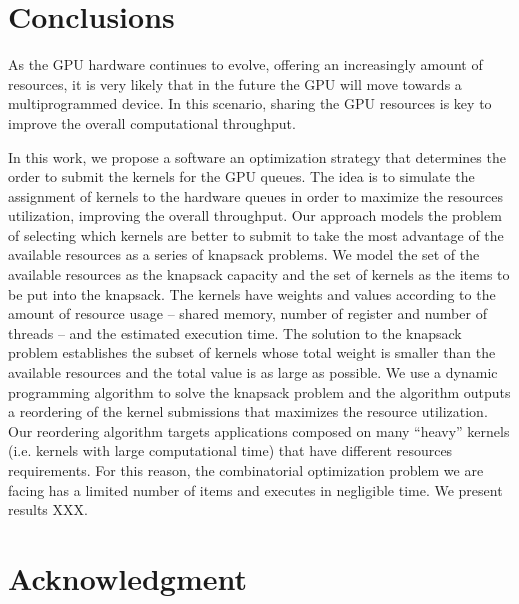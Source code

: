 \documentclass[conference]{IEEEtran}
\begin{document}
\section{Conclusions}
\label{sec:Conclusions}

As the GPU hardware continues to evolve, offering an increasingly amount of resources, it is very likely that in the future the GPU will move towards a multiprogrammed device. In this scenario, sharing the GPU resources is key to improve the overall computational throughput.


In this work, we propose a software  an optimization strategy that determines the order to submit the kernels for the GPU queues. The idea is to simulate the assignment of kernels to the hardware queues in order to maximize the resources utilization, improving the overall throughput. Our approach models the problem of selecting which kernels are better to submit to take the most advantage of the available resources as a series of knapsack problems. We model the set of the available resources as the knapsack capacity and the set of kernels as the items to be put into the knapsack. The kernels have weights and values 
according to the amount of resource usage -- shared memory, number of register and number of threads -- and the estimated execution time. The solution to the knapsack problem establishes the subset of kernels whose total weight is smaller than the available resources and the total value is as large as possible. We use a dynamic programming algorithm to solve the knapsack problem and the algorithm outputs a reordering of the kernel submissions that maximizes the resource utilization. Our reordering algorithm targets applications composed on many “heavy” kernels (i.e. kernels with large computational time) that have different resources requirements. For this reason, the combinatorial optimization problem we are facing has a limited number of items and executes in negligible time.  We present results XXX.

\section*{Acknowledgment}





\nocite{*}


\end{document}

